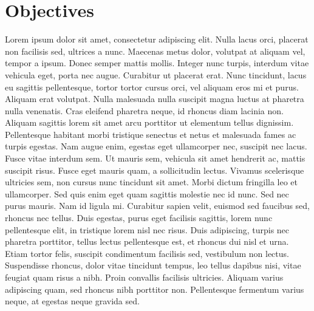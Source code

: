 \documentclass[12pt,a4paper,titlepage]{report}
\begin{document}
\section{Objectives}
Lorem ipsum dolor sit amet, consectetur adipiscing elit. Nulla lacus orci, placerat non facilisis sed, ultrices a nunc. Maecenas metus dolor, volutpat at aliquam vel, tempor a ipsum. Donec semper mattis mollis. Integer nunc turpis, interdum vitae vehicula eget, porta nec augue. Curabitur ut placerat erat. Nunc tincidunt, lacus eu sagittis pellentesque, tortor tortor cursus orci, vel aliquam eros mi et purus. Aliquam erat volutpat. Nulla malesuada nulla suscipit magna luctus at pharetra nulla venenatis. Cras eleifend pharetra neque, id rhoncus diam lacinia non. Aliquam sagittis lorem sit amet arcu porttitor ut elementum tellus dignissim. Pellentesque habitant morbi tristique senectus et netus et malesuada fames ac turpis egestas. Nam augue enim, egestas eget ullamcorper nec, suscipit nec lacus. Fusce vitae interdum sem. Ut mauris sem, vehicula sit amet hendrerit ac, mattis suscipit risus. Fusce eget mauris quam, a sollicitudin lectus.
Vivamus scelerisque ultricies sem, non cursus nunc tincidunt sit amet. Morbi dictum fringilla leo et ullamcorper. Sed quis enim eget quam sagittis molestie nec id nunc. Sed nec purus mauris. Nam id ligula mi. Curabitur sapien velit, euismod sed faucibus sed, rhoncus nec tellus. Duis egestas, purus eget facilisis sagittis, lorem nunc pellentesque elit, in tristique lorem nisl nec risus. Duis adipiscing, turpis nec pharetra porttitor, tellus lectus pellentesque est, et rhoncus dui nisl et urna. Etiam tortor felis, suscipit condimentum facilisis sed, vestibulum non lectus. Suspendisse rhoncus, dolor vitae tincidunt tempus, leo tellus dapibus nisi, vitae feugiat quam risus a nibh. Proin convallis facilisis ultricies. Aliquam varius adipiscing quam, sed rhoncus nibh porttitor non. Pellentesque fermentum varius neque, at egestas neque gravida sed.
\end{document}
